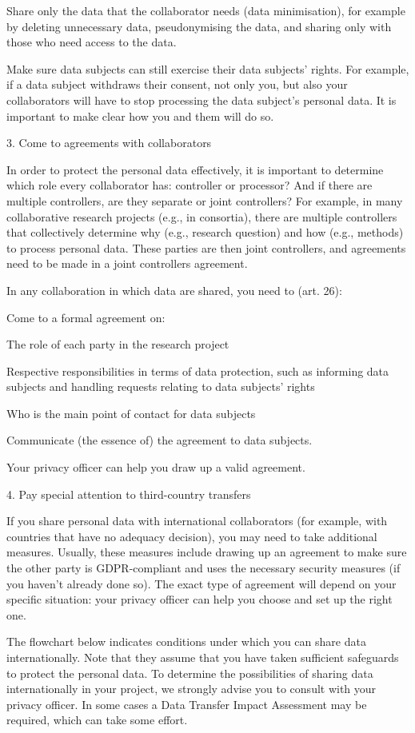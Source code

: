 \documentclass[
]{book}
\begin{document}
Share only the data that the collaborator needs (data minimisation),
for example by deleting unnecessary data, pseudonymising the data, and
sharing only with those who need access to the data.

Make sure data subjects can still exercise their
data subjects' rights. For example,
if a data subject withdraws their consent, not only you, but also your
collaborators will have to stop processing the data subject's personal
data. It is important to make clear how you and them will do so.

3. Come to agreements with collaborators

In order to protect the personal data effectively, it is important to
determine which role every collaborator has:
controller or processor? And if there are
multiple controllers, are they separate or joint controllers? For example,
in many collaborative research projects (e.g., in consortia), there are
multiple controllers that collectively determine why (e.g., research
question) and how (e.g., methods) to process personal data. These parties
are then joint controllers, and agreements need to be made in a
joint controllers agreement.

In any collaboration in which data are shared, you need to (art. 26):

Come to a formal agreement on:

The role of each party in the research project

Respective responsibilities in terms of data protection, such as informing data subjects and handling requests relating to data subjects' rights

Who is the main point of contact for data subjects

Communicate (the essence of) the agreement to data subjects.

Your
privacy officer
can help you draw up a valid agreement.

4. Pay special attention to third-country transfers

If you share personal data with international collaborators (for example,
with countries that have no
adequacy decision),
you may need to take additional measures. Usually, these measures include
drawing up an agreement to make sure the other party is GDPR-compliant and
uses the necessary security measures (if you haven't already done so). The
exact type of agreement will depend on your specific situation: your
privacy officer
can help you choose and set up the right one.

The flowchart below indicates conditions under which you can share data
internationally. Note that they assume that you have taken sufficient
safeguards to protect the personal data. To determine the possibilities
of sharing data internationally in your project, we strongly advise you
to consult with your privacy officer. In some cases a Data Transfer Impact Assessment may
be required, which can take some effort.
\end{document}
